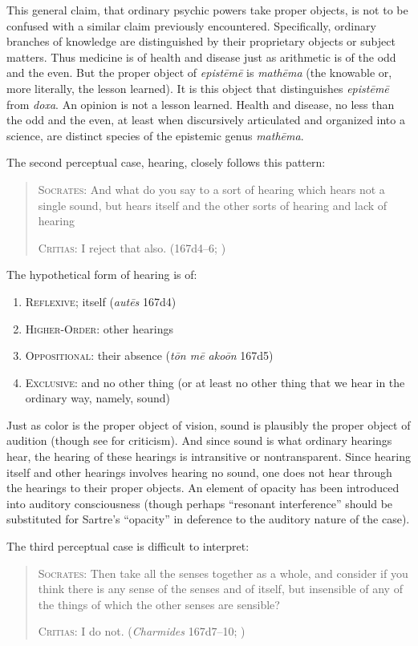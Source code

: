 This general claim, that ordinary psychic powers take proper objects, is not to be confused with a similar claim previously encountered. Specifically, ordinary branches of knowledge are distinguished by their proprietary objects or subject matters. Thus medicine is of health and disease just as arithmetic is of the odd and the even. But the proper object of \emph{epistēmē} is \emph{mathēma} (the knowable or, more literally, the lesson learned). It is this object that distinguishes \emph{epistēmē} from \emph{doxa}. An opinion is not a lesson learned. Health and disease, no less than the odd and the even, at least when discursively articulated and organized into a science, are distinct species of the epistemic genus \emph{mathēma}.

The second perceptual case, hearing, closely follows this pattern:
\begin{quotation}
	\textsc{Socrates}: And what do you say to a sort of hearing which hears not a single sound, but hears itself and the other sorts of hearing and lack of hearing
	
	\textsc{Critias}: I reject that also. (167d4–6; \citealt[59]{Lamb:1927qw})
\end{quotation}
The hypothetical form of hearing is of:
\begin{enumerate}[(1)]
	\item \textsc{Reflexive}; itself (\emph{autēs} 167d4)
	\item \textsc{Higher-Order}: other hearings
	\item \textsc{Oppositional}: their absence (\emph{tōn mē akoōn} 167d5)
	\item \textsc{Exclusive}: and no other thing (or at least no other thing that we hear in the ordinary way, namely, sound)
\end{enumerate}
Just as color is the proper object of vision, sound is plausibly the proper object of audition (though see \citealt[chapter 4.2]{Kalderon:2018oe} for criticism). And since sound is what ordinary hearings hear, the hearing of these hearings is intransitive or nontransparent. Since hearing itself and other hearings involves hearing no sound, one does not hear through the hearings to their proper objects. An element of opacity has been introduced into auditory consciousness (though perhaps ``resonant interference'' should be substituted for Sartre's ``opacity'' in deference to the auditory nature of the case).

The third perceptual case is difficult to interpret:
\begin{quotation}
	\textsc{Socrates}: Then take all the senses together as a whole, and consider if you think there is any sense of the senses and of itself, but insensible of any of the things of which the other senses are sensible?
	
	\textsc{Critias}: I do not. (\emph{Charmides} 167d7–10; \citealt[59]{Lamb:1927qw})
\end{quotation}

